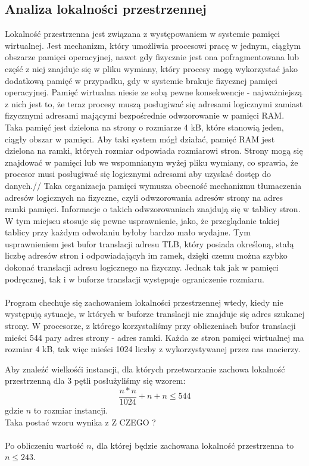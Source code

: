 \documentclass[10pt,a4paper]{article}
\begin{document}
\subsection{Analiza lokalności przestrzennej}
Lokalność przestrzenna jest związana z występowaniem w systemie pamięci wirtualnej.
Jest mechanizm, który umożliwia procesowi pracę w jednym, ciągłym obszarze pamięci operacyjnej,
nawet gdy fizycznie jest ona pofragmentowana lub część z niej znajduje się w pliku wymiany,
który procesy mogą wykorzystać jako dodatkową pamięć w przypadku, gdy w systemie brakuje
fizycznej pamięci operacyjnej. Pamięć wirtualna niesie ze sobą pewne konsekwencje -
najważniejszą z nich jest to, że teraz procesy muszą posługiwać się adresami logicznymi
zamiast fizycznymi adresami mającymi bezpośrednie odwzorowanie w pamięci RAM.
Taka pamięć jest dzielona na strony o rozmiarze 4 kB, które stanowią jeden, ciągły obszar w pamięci.
Aby taki system mógł działać, pamięć RAM jest dzielona na ramki, których rozmiar odpowiada
rozmiarowi stron. Strony mogą się znajdować w pamięci lub we wspomnianym wyżej pliku wymiany,
co sprawia, że procesor musi posługiwać się logicznymi adresami aby uzyskać dostęp do danych.//
Taka organizacja pamięci wymusza obecność mechanizmu tłumaczenia adresów logicznych
na fizyczne, czyli odwzorowania adresów strony na adres ramki pamięci. Informacje o takich
odwzorowaniach znajdują się w tablicy stron. W tym miejscu stosuje się pewne usprawnienie, jako, że
przeglądanie takiej tablicy przy każdym odwołaniu byłoby bardzo mało wydajne. Tym usprawnieniem
jest bufor translacji adresu TLB, który posiada określoną, stałą liczbę adresów stron i odpowiadającyh
im ramek, dzięki czemu można szybko dokonać translacji adresu logicznego na fizyczny.
Jednak tak jak w pamięci podręcznej, tak i w buforze translacji występuje ograniczenie rozmiaru.\\
\\
Program chechuje się zachowaniem lokalności przestrzennej wtedy, kiedy nie występują sytuacje,
w których w buforze translacji nie znajduje się adres szukanej strony. W procesorze, z którego
korzystaliśmy przy obliczeniach bufor translacji mieści 544 pary adres strony - adres ramki.
Każda ze stron pamięci wirtualnej ma rozmiar 4 kB, tak więc mieści 1024 liczby z wykorzystywanej
przez nas macierzy.


Aby znaleźć wielkośći instancji, dla których przetwarzanie zachowa lokalność przestrzenną dla
3 pętli posłużyliśmy się wzorem:
$$
    \frac{n*n}{1024} + n + n \leq 544
$$
gdzie $n$ to rozmiar instancji.\\
Taka postać wzoru wynika z Z CZEGO ?\\
\\
Po obliczeniu wartość $n$, dla której będzie zachowana lokalność przestrzenna to $n \leq 243$.
\\
\end{document}
